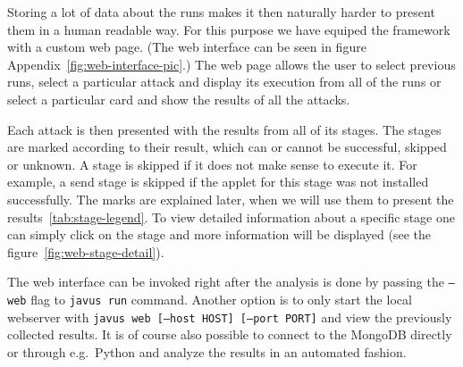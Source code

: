        Storing a lot of data about the runs makes it then naturally harder to present them in a human readable way. For this purpose we have equiped the framework with a custom web page. (The web interface can be seen in figure Appendix~\ref{fig:web-interface-pic}.) The web page allows the user to select previous runs, select a particular attack and display its execution from all of the runs or select a particular card and show the results of all the attacks. 

        Each attack is then presented with the results from all of its stages. The stages are marked according to their result, which can or cannot be successful, skipped or unknown. A stage is skipped if it does not make sense to execute it. For example, a send stage is skipped if the applet for this stage was not installed successfully. The marks are explained later, when we will use them to present the results~\ref{tab:stage-legend}.
            To view detailed information about a specific stage one can simply click on the stage and more information will be displayed (see the figure~\ref{fig:web-stage-detail}).


    The web interface can be invoked right after the analysis is done by passing the \texttt{--web} flag to \texttt{javus run} command. Another option is to only start the local webserver with \texttt{javus web [--host HOST] [--port PORT]} and view the previously collected results.
    It is of course also possible to connect to the MongoDB directly or through e.g.\ Python and analyze the results in an automated fashion.
            




